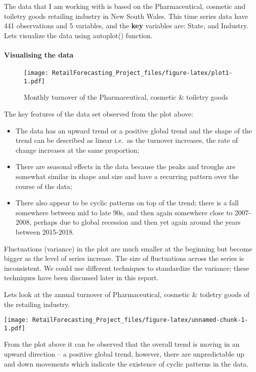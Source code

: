 \documentclass[
]{article}
\begin{document}
The data that I am working with is based on the Pharmaceutical, cosmetic
and toiletry goods retailing industry in New South Wales. This time
series data have 441 observations and 5 variables, and the \textbf{key}
variables are: State, and Industry. Lets visualize the data using
autoplot() function.

\hypertarget{visualising-the-data}{%
\paragraph{Visualising the data}\label{visualising-the-data}}

\begin{figure}
\centering
\texttt{[image: RetailForecasting\_Project\_files/figure-latex/plot1-1.pdf]}
\caption{Monthly turnover of the Pharmaceutical, cosmetic \& toiletry
goods}
\end{figure}

The key features of the data set observed from the plot above:

\begin{itemize}
\item
  The data has an upward trend or a positive global trend and the shape
  of the trend can be described as linear i.e.~as the turnover
  increases, the rate of change increases at the same proportion;
\item
  There are seasonal effects in the data because the peaks and troughs
  are somewhat similar in shape and size and have a recurring pattern
  over the course of the data;
\item
  There also appear to be cyclic patterns on top of the trend; there is
  a fall somewhere between mid to late 90s, and then again somewhere
  close to 2007-2008, perhaps due to global recession and then yet again
  around the years between 2015-2018.
\end{itemize}

Fluctuations (variance) in the plot are much smaller at the beginning
but become bigger as the level of series increase. The size of
fluctuations across the series is inconsistent. We could use different
techniques to standardize the variance; these techniques have been
discussed later in this report.

Lets look at the annual turnover of Pharmaceutical, cosmetic \& toiletry
goods of the retailing industry.

\texttt{[image: RetailForecasting\_Project\_files/figure-latex/unnamed-chunk-1-1.pdf]}

From the plot above it can be observed that the overall trend is moving
in an upward direction -- a positive global trend, however, there are
unpredictable up and down movements which indicate the existence of
cyclic patterns in the data.
\end{document}

